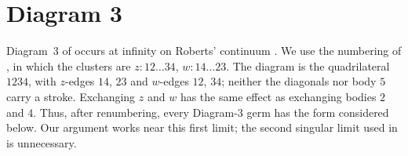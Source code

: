 \documentclass[11pt]{amsart}
\theoremstyle{definition}
\theoremstyle{remark}
\begin{document}
\section{Diagram 3}\label{sec:d3}

{Diagram~3 of \cite[Fig.~11]{AK} occurs at infinity on Roberts' continuum
\cite[\S7.2]{AK}. We use the numbering of \cite[\S5.2 and \S8.3]{AK}, in which the clusters are
$z:12\ldots34$, $w:14\ldots23$. The diagram is the quadrilateral $1234$, with $z$-edges $14$, $23$ and
$w$-edges $12$, $34$; neither the diagonals nor body $5$ carry a stroke. Exchanging $z$ and $w$
has the same effect as exchanging bodies $2$ and $4$. Thus, after renumbering, every Diagram-3 germ
has the form considered below. Our argument works near this first limit; the second singular
limit used in \cite[proof of Thm.~6(iii)]{AK} is unnecessary.}
\end{document}
